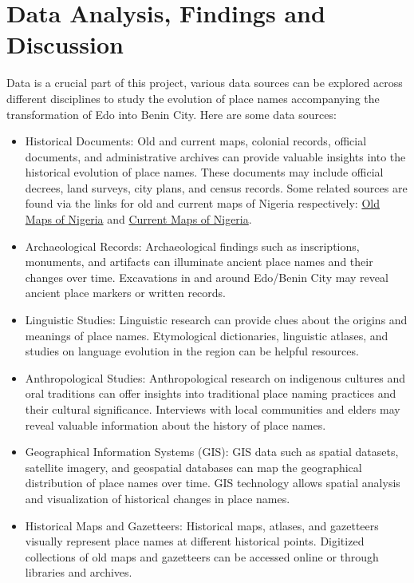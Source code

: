 \chapter{Data Analysis, Findings and Discussion }

Data is a crucial part of this project, various data sources can be explored across different disciplines to study the evolution of place names accompanying the transformation of Edo into Benin City. Here are some data sources:

\begin{itemize}
    \item Historical Documents: Old and current maps, colonial records, official documents, and administrative archives can provide valuable insights into the historical evolution of place names. These documents may include official decrees, land surveys, city plans, and census records. Some related sources are found via the links for old and current maps of Nigeria respectively: \href{https://www.oldmapsonline.org/en/Nigeria}{Old Maps of Nigeria} and \href{https://nigeria.africageoportal.com/pages/Tools}{Current Maps of Nigeria}.
    \item Archaeological Records: Archaeological findings such as inscriptions, monuments, and artifacts can illuminate ancient place names and their changes over time. Excavations in and around Edo/Benin City may reveal ancient place markers or written records.
    \item Linguistic Studies: Linguistic research can provide clues about the origins and meanings of place names. Etymological dictionaries, linguistic atlases, and studies on language evolution in the region can be helpful resources.
    \item Anthropological Studies: Anthropological research on indigenous cultures and oral traditions can offer insights into traditional place naming practices and their cultural significance. Interviews with local communities and elders may reveal valuable information about the history of place names.
    \item Geographical Information Systems (GIS): GIS data such as spatial datasets, satellite imagery, and geospatial databases can map the geographical distribution of place names over time. GIS technology allows spatial analysis and visualization of historical changes in place names.
    \item Historical Maps and Gazetteers: Historical maps, atlases, and gazetteers visually represent place names at different historical points. Digitized collections of old maps and gazetteers can be accessed online or through libraries and archives.

\end{itemize}
